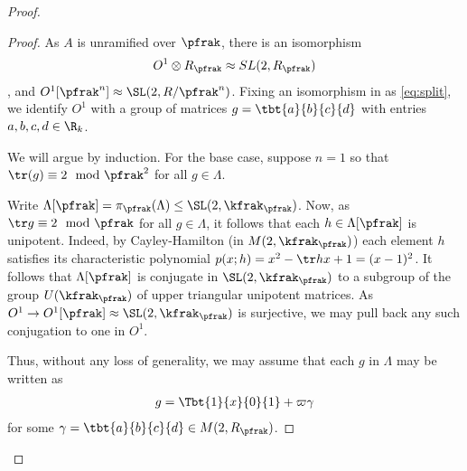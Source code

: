 \begin{proof}
\begin{proof}
  As $A$ is unramified over $\pfrak$, there is an isomorphism
  \begin{align}\label{eq:split}
    O^1 \otimes R_\pfrak \approx SL(2,R_\pfrak)
  \end{align}, and $O^1[\pfrak^n] \approx \SL(2,R/\pfrak^n)$. Fixing an isomorphism in as \ref{eq:split}, we identify $O^1$ with a group of matrices $g = \tbt{a}{b}{c}{d}$ with entries $a,b,c,d \in \R_k$.

  We will argue by induction. For the base case, suppose $n=1$ so that $\tr(g) \equiv 2 \mod \pfrak^2$ for all $g \in \Lambda$.


  Write $\Lambda[\pfrak] = \pi_{\pfrak}(\Lambda)\leq \SL(2,\kfrak_\pfrak)$. Now, as $\tr g \equiv 2 \mod \pfrak$ for all $g \in \Lambda$, it follows that each $h \in \Lambda[\pfrak]$ is unipotent.
  Indeed, by Cayley-Hamilton (in $M(2,\kfrak_\pfrak)$) each element $h$ satisfies its characteristic polynomial $p(x;h)=x^2 - \tr h x + 1= (x-1)^2$.
  It follows that $\Lambda[\pfrak]$ is conjugate in $\SL(2,\kfrak_\pfrak)$ to a subgroup of the group $U(\kfrak_\pfrak)$ of upper triangular unipotent matrices. As $O^1 \to O^1[\pfrak]\approx \SL(2,\kfrak_\pfrak)$ is surjective, we may pull back any such conjugation to one in $O^1$.

  Thus, without any loss of generality, we may assume that each $g$ in $\Lambda$ may be written as
  \begin{align*}
    g = \Tbt{1}{x}{0}{1} + \varpi \gamma
  \end{align*}
  for some $\gamma = \tbt{a}{b}{c}{d} \in M(2, R_\pfrak)$.


\end{proof}
\end{proof}
